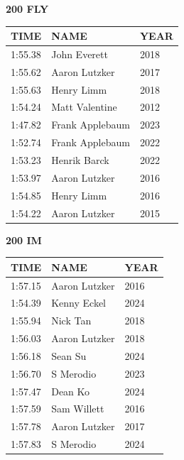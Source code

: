 \begin{table}[H]
\centering
\begin{minipage}[t]{0.48\textwidth}
\centering
\textbf{200 FLY}\\[0.1cm]
\begin{tabular}{@{}p{1.8cm}p{2.8cm}p{1.2cm}@{}}
\hline
    \textbf{TIME} & \textbf{NAME} & \textbf{YEAR} \\
\hline
    1:55.38 & John Everett & 2018 \\
    1:55.62 & Aaron Lutzker & 2017 \\
    1:55.63 & Henry Limm & 2018 \\
    1:54.24 & Matt Valentine & 2012 \\
    1:47.82 & Frank Applebaum & 2023 \\
    1:52.74 & Frank Applebaum & 2022 \\
    1:53.23 & Henrik Barck & 2022 \\
    1:53.97 & Aaron Lutzker & 2016 \\
    1:54.85 & Henry Limm & 2016 \\
    1:54.22 & Aaron Lutzker & 2015 \\
\hline
\end{tabular}
\end{minipage}\hfill
\begin{minipage}[t]{0.48\textwidth}
\centering
\textbf{200 IM}\\[0.1cm]
\begin{tabular}{@{}p{1.8cm}p{2.8cm}p{1.2cm}@{}}
\hline
    \textbf{TIME} & \textbf{NAME} & \textbf{YEAR} \\
\hline
    1:57.15 & Aaron Lutzker & 2016 \\
    1:54.39 & Kenny Eckel & 2024 \\
    1:55.94 & Nick Tan & 2018 \\
    1:56.03 & Aaron Lutzker & 2018 \\
    1:56.18 & Sean Su & 2024 \\
    1:56.70 & S Merodio & 2023 \\
    1:57.47 & Dean Ko & 2024 \\
    1:57.59 & Sam Willett & 2016 \\
    1:57.78 & Aaron Lutzker & 2017 \\
    1:57.83 & S Merodio & 2024 \\
\hline
\end{tabular}
\end{minipage}
\end{table}

